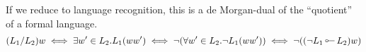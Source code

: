 \documentclass[12pt]{article}
\newcommand{\leftmultimap}{\mathop{\rotatebox[origin=c]{180}{$\multimap$}}}
\newtheorem{definition}{Definition}
\begin{document}
If we reduce to language recognition, this is a de Morgan-dual of the
``quotient'' of a formal language.
\[ (L_1 / L_2) w \iff \exists w' \in L_2. L_1(ww') \iff \neg (\forall w' \in L_2. \neg L_1(ww')) \iff \neg ((\neg L_1 \leftmultimap L_2) w) \]









\end{document}
